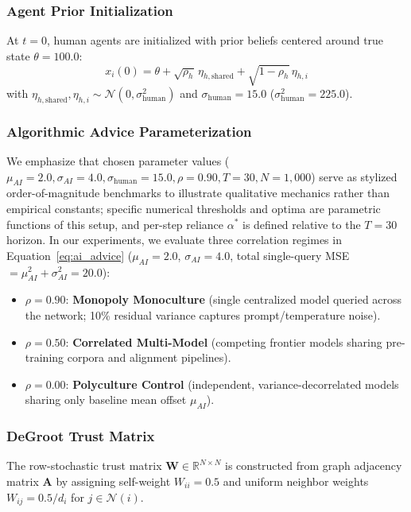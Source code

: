 \documentclass
[letterpaper]{article}
\begin{document}
\subsubsection{Agent Prior Initialization}
At $t = 0$, human agents are initialized with prior beliefs centered around true state $\theta = 100.0$:
\begin{equation}
x_i(0) = \theta + \sqrt{\rho_h} \, \eta_{h, \text{shared}} + \sqrt{1 - \rho_h} \, \eta_{h, i}
\end{equation}
with $\eta_{h, \text{shared}}, \eta_{h, i} \sim \mathcal{N}(0, \sigma_{\text{human}}^2)$ and $\sigma_{\text{human}} = 15.0$ ($\sigma_{\text{human}}^2 = 225.0$). 

\subsubsection{Algorithmic Advice Parameterization}
We emphasize that chosen parameter values ($\mu_{AI} = 2.0, \sigma_{AI} = 4.0, \sigma_{\text{human}} = 15.0, \rho = 0.90, T = 30, N = 1,000$) serve as stylized order-of-magnitude benchmarks to illustrate qualitative mechanics rather than empirical constants; specific numerical thresholds and optima are parametric functions of this setup, and per-step reliance $\alpha^*$ is defined relative to the $T=30$ horizon. In our experiments, we evaluate three correlation regimes in Equation~\ref{eq:ai_advice} ($\mu_{AI} = 2.0$, $\sigma_{AI} = 4.0$, total single-query MSE $= \mu_{AI}^2 + \sigma_{AI}^2 = 20.0$):
\begin{itemize}\setlength{\itemsep}{0pt}\setlength{\parskip}{0pt}\setlength{\parsep}{0pt}
    \item $\rho = 0.90$: \textbf{Monopoly Monoculture} (single centralized model queried across the network; 10\% residual variance captures prompt/temperature noise).
    \item $\rho = 0.50$: \textbf{Correlated Multi-Model} (competing frontier models sharing pre-training corpora and alignment pipelines).
    \item $\rho = 0.00$: \textbf{Polyculture Control} (independent, variance-decorrelated models sharing only baseline mean offset $\mu_{AI}$).
\end{itemize}

\subsubsection{DeGroot Trust Matrix}
The row-stochastic trust matrix $\mathbf{W} \in \mathbb{R}^{N \times N}$ is constructed from graph adjacency matrix $\mathbf{A}$ by assigning self-weight $W_{ii} = 0.5$ and uniform neighbor weights $W_{ij} = 0.5 / d_i$ for $j \in \mathcal{N}(i)$.
\end{document}
